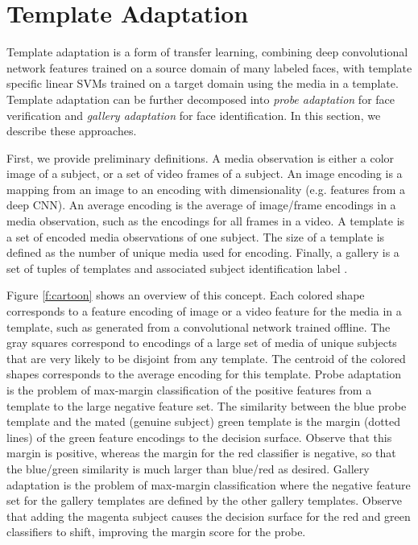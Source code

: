 \documentclass[10pt,twocolumn,letterpaper]{article}
\theoremstyle{definition}		\newtheorem{defn}[thm]{Definition}
\begin{document}
\section{Template Adaptation}
\label{s:template_adaptation}




Template adaptation is a form of transfer learning, combining deep convolutional network features trained on a source domain of many labeled faces, with template specific linear SVMs trained on a target domain using the media in a template.  Template adaptation can be further decomposed into {\em probe adaptation} for face verification and {\em gallery adaptation} for face identification.
In this section, we describe these approaches.

First, we provide preliminary definitions.  A media observation  is either a color image of a subject, or a set of  video frames of a subject.      
An image encoding  is a mapping  from an image  to an encoding  with dimensionality  (e.g. features from a deep CNN).  An average encoding  is the average of image/frame encodings in a media observation, such as the encodings for all frames in a video.  A template  is a set of encoded media observations  of one subject.  The size of a template  is defined as the number of unique media used for encoding.  Finally, a gallery  is a set of tuples of templates  and associated subject identification label . 

Figure \ref{f:cartoon} shows an overview of this concept.  Each colored shape corresponds to a feature encoding of image or a video feature for the media in a template, such as generated from a convolutional network trained offline. The gray squares correspond to encodings of a large set of media of unique subjects that are very likely to be disjoint from any template.  The centroid of the colored shapes corresponds to the average encoding for this template.  
Probe adaptation is the problem of max-margin classification of the positive features from a template to the large negative feature set.  The similarity between the blue probe template and the mated (genuine subject) green template is the margin (dotted lines) of the green feature encodings to the decision surface.  Observe that this margin is positive, whereas the margin for the red classifier is negative, so that the blue/green similarity is much larger than blue/red as desired.  Gallery adaptation is the problem of max-margin classification where the negative feature set for the gallery templates are defined by the other gallery templates.  Observe that adding the magenta subject causes the decision surface for the red and green classifiers to shift, improving the margin score for the probe. 
\end{document}
